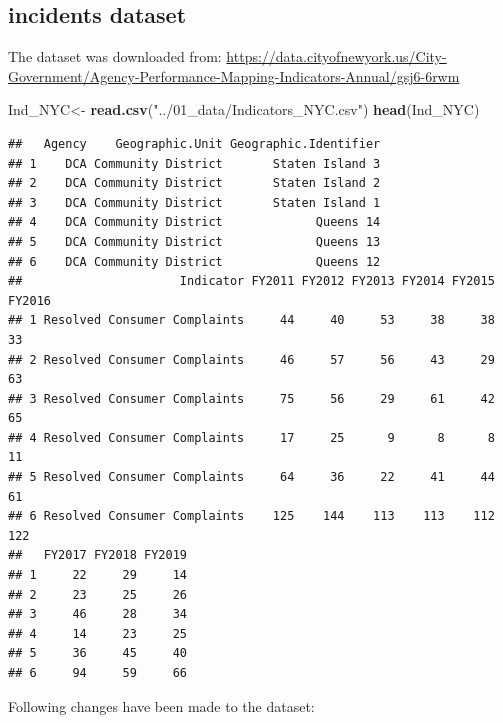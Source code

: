 \documentclass[]{article}
\newenvironment{Shaded}{\begin{snugshade}}{\end{snugshade}}
\newcommand{\CommentTok}[1]{\textcolor[rgb]{0.56,0.35,0.01}{\textit{#1}}}
\newcommand{\DecValTok}[1]{\textcolor[rgb]{0.00,0.00,0.81}{#1}}
\newcommand{\KeywordTok}[1]{\textcolor[rgb]{0.13,0.29,0.53}{\textbf{#1}}}
\newcommand{\NormalTok}[1]{#1}
\newcommand{\OperatorTok}[1]{\textcolor[rgb]{0.81,0.36,0.00}{\textbf{#1}}}
\newcommand{\StringTok}[1]{\textcolor[rgb]{0.31,0.60,0.02}{#1}}
\begin{document}
\hypertarget{incidents-dataset}{%
\subsection{incidents dataset}\label{incidents-dataset}}

The dataset was downloaded from:
\url{https://data.cityofnewyork.us/City-Government/Agency-Performance-Mapping-Indicators-Annual/gsj6-6rwm}

\begin{Shaded}
\begin{Highlighting}[]
\NormalTok{Ind_NYC<-}\StringTok{ }\KeywordTok{read.csv}\NormalTok{(}\StringTok{"../01_data/Indicators_NYC.csv"}\NormalTok{)}
\KeywordTok{head}\NormalTok{(Ind_NYC)}
\end{Highlighting}
\end{Shaded}

\begin{verbatim}
##   Agency    Geographic.Unit Geographic.Identifier
## 1    DCA Community District       Staten Island 3
## 2    DCA Community District       Staten Island 2
## 3    DCA Community District       Staten Island 1
## 4    DCA Community District             Queens 14
## 5    DCA Community District             Queens 13
## 6    DCA Community District             Queens 12
##                      Indicator FY2011 FY2012 FY2013 FY2014 FY2015 FY2016
## 1 Resolved Consumer Complaints     44     40     53     38     38     33
## 2 Resolved Consumer Complaints     46     57     56     43     29     63
## 3 Resolved Consumer Complaints     75     56     29     61     42     65
## 4 Resolved Consumer Complaints     17     25      9      8      8     11
## 5 Resolved Consumer Complaints     64     36     22     41     44     61
## 6 Resolved Consumer Complaints    125    144    113    113    112    122
##   FY2017 FY2018 FY2019
## 1     22     29     14
## 2     23     25     26
## 3     46     28     34
## 4     14     23     25
## 5     36     45     40
## 6     94     59     66
\end{verbatim}

Following changes have been made to the dataset:

\begin{Shaded}
\end{Shaded}
\end{document}
